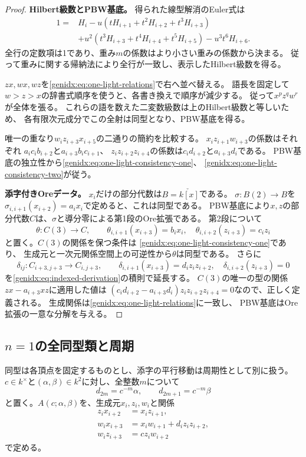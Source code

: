 \documentclass[11pt,a4paper]{ltjsarticle}
\theoremstyle{definition}
\begin{document}
\begin{proof}
\par\smallskip\noindent\textbf{Hilbert級数とPBW基底。}\quad
得られた線型解消のEuler式は
\begin{align*}
1={}&H_i-u(tH_{i+1}+t^2H_{i+2}+t^3H_{i+3})\\
&+u^2(t^3H_{i+3}+t^4H_{i+4}+t^5H_{i+5})-u^3t^6H_{i+6}.
\end{align*}
全行の定数項は1であり、重み$m$の係数はより小さい重みの係数から決まる。
従って重みに関する帰納法により全行が一致し、表示したHilbert級数を得る。

$zx,wx,wz$を\eqref{genidx:eq:one-light-relations}で右へ並べ替える。
語長を固定して$w>z>x$の辞書式順序を使うと、各書き換えで順序が減少する。
従って$x^p z^q w^r$が全体を張る。
これらの語を数えた二変数級数は上のHilbert級数と等しいため、
各有限次元成分でこの全射は同型となり、PBW基底を得る。

唯一の重なり$w_i z_{i+3}x_{i+5}$の二通りの簡約を比較する。
$x_i z_{i+1}w_{i+3}$の係数はそれぞれ
$a_i c_i b_{i+2}$と$a_{i+3}b_i c_{i+1}$、
$z_i z_{i+2}z_{i+4}$の係数は$c_i d_{i+2}$と$a_{i+3}d_i$である。
PBW基底の独立性から\eqref{genidx:eq:one-light-consistency-one}、
\eqref{genidx:eq:one-light-consistency-two}が従う。

\par\smallskip\noindent\textbf{添字付きOreデータ。}\quad
$x_i$だけの部分代数は$B=\check{k[x]}$である。
$\sigma:B(2)\to B$を
$\sigma_{i,i+1}(x_{i+2})=a_i x_i$で定めると、これは同型である。
PBW基底により$x,z$の部分代数$C$は、$\sigma$と導分零による第1段のOre拡張である。
第2段について
\[
\theta:C(3)\to C,\qquad
\theta_{i,i+1}(x_{i+3})=b_i x_i,\quad
\theta_{i,i+2}(z_{i+3})=c_i z_i
\]
と置く。$C(3)$の関係を保つ条件は
\eqref{genidx:eq:one-light-consistency-one}であり、
生成元と一次元関係空間上の可逆性から$\theta$は同型である。
さらに
\[
\delta_{ij}:C_{i+3,j+3}\to C_{i,j+3},\qquad
\delta_{i,i+1}(x_{i+3})=d_i z_i z_{i+2},\quad
\delta_{i,i+2}(z_{i+3})=0
\]
を\eqref{genidx:eq:indexed-derivation}の積則で延長する。
$C(3)$の唯一の型の関係$zx-a_{i+3}xz$に適用した値は
$(c_i d_{i+2}-a_{i+3}d_i)z_i z_{i+2}z_{i+4}=0$なので、正しく定義される。
生成関係は\eqref{genidx:eq:one-light-relations}に一致し、
PBW基底はOre拡張の一意な分解を与える。
\end{proof}

\subsection{$n=1$の全同型類と周期}
同型は各頂点を固定するものとし、添字の平行移動は周期性として別に扱う。
$c\in k^\times$と$(\alpha,\beta)\in k^2$に対し、全整数$m$について
\begin{equation}\label{genidx:eq:normal-d-sequence}
d_{2m}=c^{-m}\alpha,\qquad d_{2m+1}=c^{-m}\beta
\end{equation}
と置く。$A(c;\alpha,\beta)$を、生成元$x_i,z_i,w_i$と関係
\begin{equation}\label{genidx:eq:normal-one-light}
\begin{aligned}
z_i x_{i+2}&=x_i z_{i+1},\\
w_i x_{i+3}&=x_i w_{i+1}+d_i z_i z_{i+2},\\
w_i z_{i+3}&=c z_i w_{i+2}
\end{aligned}
\end{equation}
で定める。
\end{document}
